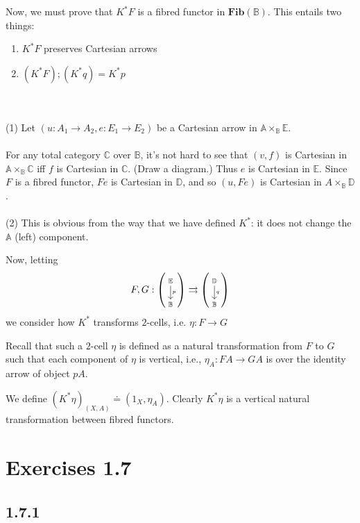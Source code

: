 \documentclass{article}
\newcommand{\mbf}{\mathbf}
\newcommand{\ddisp}[3]{
\left(
\scriptsize
\begin{tikzcd}
#1 \ar[d, "\footnotesize{#2}"] \\
#3
\end{tikzcd}
\normalsize
\right)
}
\begin{document}
Now, we must prove that $K^*F$ is a fibred functor in $\mbf{Fib}(\mathbb B)$. This entails two things:
\begin{enumerate}
\item $K^*F$ preserves Cartesian arrows
\item $(K^*F);(K^*q) = K^*p$
\end{enumerate}
~\\~\\
(1) Let $(u : A_1 \to A_2, e : E_1 \to E_2)$ be a Cartesian arrow in $\mathbb A \times_{\mathbb B} \mathbb E$.
\\~\\
For any total category $\mathbb C$ over $\mathbb B$, it's not hard to see that $(v,f)$ is Cartesian
in $\mathbb A \times_{\mathbb B} \mathbb C$ iff $f$ is Cartesian in $\mathbb C$. (Draw a diagram.)
Thus $e$ is Cartesian in $\mathbb E$. Since $F$ is a fibred functor, $Fe$ is Cartesian in $\mathbb D$,
and so $(u,Fe)$ is Cartesian in $A \times_{\mathbb B} \mathbb D$.
\\~\\
(2) This is obvious from the way that we have defined $K^*$: it does not change the $\mathbb A$ (left) component.

Now, letting 
$$F,G : \ddisp{\mathbb E}{p}{\mathbb B} \rightrightarrows \ddisp{\mathbb D}{q}{\mathbb B}$$
we consider how $K^*$ transforms $2$-cells, i.e.
$\eta : F \to G$

Recall that such a $2$-cell $\eta$ is defined as a natural transformation from $F$ to $G$ such that each component
of $\eta$ is vertical, i.e., $\eta_A : FA \to GA$ is over the identity arrow of object $pA$.

We define $(K^*\eta)_{(X,A)} \doteq (1_X, \eta_A)$. Clearly $K^*\eta$ is a vertical natural transformation between fibred 
functors.
 



\section*{Exercises 1.7}

\subsection*{1.7.1}
\end{document}
